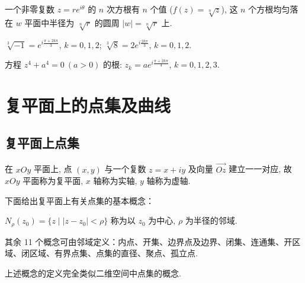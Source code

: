 \documentclass[theorem=false,mathfont=none,openany,sub3section]{easybook}
\begin{document}
\begin{theorem}
  一个非零复数 $z=re^{i\theta}$ 的 $n$ 次方根有 $n$ 个值 ($f(z)=\sqrt[n]{z}$), 这 $n$ 个方根均匀落在
  $w$ 平面中半径为 $\sqrt[n]{r}$ 的圆周 $|w|=\sqrt[n]{r}$ 上.
\end{theorem}

\begin{center}
\end{center}

\begin{example}
  $\sqrt[3]{-1}=e^{i\frac{\pi+2k\pi}{3}}$, $k=0,1,2$;\quad
  $\sqrt[3]{8}=2e^{i\frac{2k\pi}{3}}$, $k=0,1,2$.
\end{example}

\begin{example}
  方程 $z^{4}+a^{4}=0\ (a>0)$ 的根: $z_{k}=ae^{i\frac{\pi+2k\pi}{4}}$, $k=0,1,2,3$.
\end{example}

\newpage

\section{复平面上的点集及曲线}

\subsection{复平面上点集}

在 $xOy$ 平面上, 点 $(x,y)$ 与一个复数 $z=x+iy$ 及向量 $\overrightarrow{Oz}$ 建立一一对应, 故 $xOy$ 平面称为复平面, $x$ 轴称为实轴, $y$ 轴称为虚轴.

下面给出复平面上有关点集的基本概念：

\begin{definition}
  $N_{\rho}(z_{0})=\{z\mid|z-z_{0}|<\rho\}$ 称为以 $z_{0}$ 为中心, $\rho$ 为半径的邻域.\par
  其余 11 个概念可由邻域定义：内点、开集、边界点及边界、闭集、连通集、开区域、闭区域、有界点集、点集的直径、聚点、孤立点.\par
  上述概念的定义完全类似二维空间中点集的概念.
\end{definition}
\end{document}
